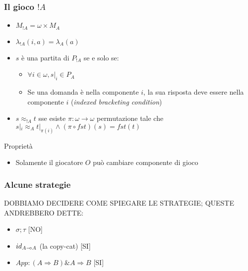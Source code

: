 \documentclass{beamer}
\newcommand{\limp}{\mathbin{{-}\mkern-3.5mu{\circ}}}
\begin{document}
\begin{frame}
	
	\frametitle{Il gioco $!A$}
	
	\begin{itemize}
		\item $M_{!A}=\omega \times M_A$
		\item $\lambda_{!A}(i,a)=\lambda_A(a)$
		\item $s$ è una partita di $P_{!A}$ se e solo se:
		\begin{itemize}
			\item $\forall i\in \omega , s|_i \in P_A$
			\item Se una domanda è nella componente $i$, la sua risposta deve essere nella componente $i$ (\emph{indexed bracketing condition})
		\end{itemize}

		\item $s\approx_{!A} t$ sse esiste $\pi:\omega \rightarrow \omega$ permutazione tale che $s|_i \approx_A t|_{\pi(i)} \wedge (\pi \circ fst)(s)=fst(t)$
	\end{itemize}
	
	\begin{block}{Proprietà}
		\begin{itemize}
			\item Solamente il giocatore $O$ può cambiare componente di gioco
		\end{itemize}
		
	\end{block}
	
\end{frame}

\begin{frame}

	\frametitle{Alcune strategie}
	
	DOBBIAMO DECIDERE COME SPIEGARE LE STRATEGIE; QUESTE ANDREBBERO DETTE:
	\begin{itemize}
		\item $\sigma ; \tau$ [NO]
		\item $id_{A\limp A}$ (la copy-cat) [SI]
		\item $App:(A \Rightarrow B)\& A \Rightarrow B$ [SI]
	\end{itemize}

\end{frame}
\end{document}

